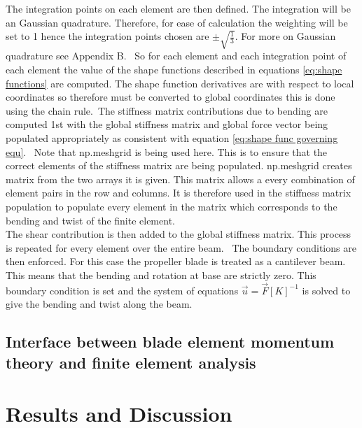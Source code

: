 \documentclass[]{report}
\begin{document}
The integration points on each element are then defined. The integration will be an Gaussian quadrature. Therefore, for ease of calculation the weighting will be set to 1 hence the integration points chosen are $\pm \sqrt{\frac{1}{3}}$. For more on Gaussian quadrature see Appendix B.
\
So for each element and each integration point of each element the value of the shape functions described in equations \ref{eq:shape functions} are computed. The shape function derivatives are with respect to local coordinates so therefore must be converted to global coordinates this is done using the chain rule.\
The stiffness matrix contributions due to bending are computed 1st with the global stiffness matrix and global force vector being populated appropriately as consistent with equation \ref{eq:shape func governing equ}. \
Note that np.meshgrid is being used here. This is to ensure that the correct elements of the stiffness matrix are being populated. np.meshgrid creates matrix from the two arrays it is given. This matrix allows a every combination of element pairs in the row and columns. It is therefore used in the stiffness matrix population to populate every element in the matrix which corresponds to the bending and twist of the finite element.
\\
The shear contribution is then added to the global stiffness matrix. This process is repeated for every element over the entire beam.
\ The boundary conditions are then enforced. For this case the propeller blade is treated as a cantilever beam. This means that the bending and rotation at base are strictly zero. This boundary condition is set and the system of equations $\vec{u} = \vec{F}[K]^{-1}$ is solved to give the bending and twist along the beam.

\section{Interface between blade element momentum theory and finite element analysis}


\chapter{Results and Discussion}
\label{ch:Results and Discussion}
\end{document}
